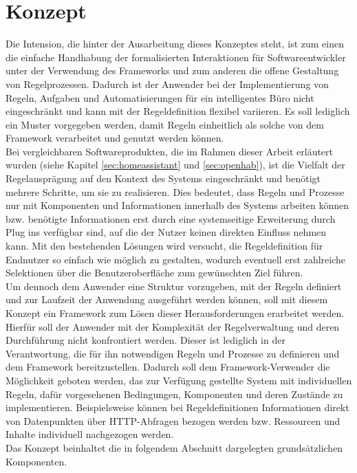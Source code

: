 \section{Konzept}
\label{sec:concept}
    Die Intension, die hinter der Ausarbeitung dieses Konzeptes steht, ist zum einen die einfache Handhabung der 
    formalisierten Interaktionen für Softwareentwickler %
    unter der Verwendung des Frameworks und zum anderen die 
    offene Gestaltung von Regelprozessen. Dadurch ist der Anwender bei der Implementierung von Regeln, Aufgaben und Automatisierungen 
    für ein intelligentes Büro nicht eingeschränkt und kann mit der Regeldefinition flexibel variieren.
    Es soll lediglich ein Muster vorgegeben werden, damit Regeln einheitlich als solche von dem Framework 
    verarbeitet und genutzt werden können. 
    \\ 
    \linebreak
    Bei vergleichbaren Softwareprodukten, die im Rahmen dieser Arbeit erläutert 
    wurden (siehe Kapitel \ref{sec:homeassistant} und \ref{sec:openhab}), ist die Vielfalt der Regelausprägung auf 
    den Kontext des Systems eingeschränkt und benötigt mehrere Schritte, um sie zu realisieren. Dies bedeutet, dass 
    Regeln und Prozesse nur mit Komponenten und Informationen innerhalb des Systems arbeiten können bzw. benötigte 
    Informationen erst durch eine systemseitige Erweiterung durch Plug ins verfügbar sind, auf die der Nutzer keinen direkten 
    Einfluss nehmen kann. Mit den bestehenden Lösungen wird versucht, die Regeldefinition für Endnutzer so 
    einfach wie möglich zu gestalten, wodurch eventuell erst zahlreiche Selektionen über die Benutzeroberfläche zum gewünschten Ziel führen.   
    \\
    \linebreak
    Um dennoch dem Anwender eine Struktur vorzugeben, mit der Regeln definiert und zur Laufzeit der Anwendung ausgeführt 
    werden können, soll mit diesem Konzept ein Framework zum Lösen dieser Herausforderungen erarbeitet werden. Hierfür soll 
    der Anwender mit der Komplexität der Regelverwaltung und deren Durchführung nicht konfrontiert werden. Dieser ist lediglich 
    in der Verantwortung, die für ihn notwendigen Regeln und Prozesse zu definieren und dem Framework bereitzustellen. 
    Dadurch soll dem Framework-Verwender die Möglichkeit geboten werden, das zur Verfügung gestellte System 
    mit individuellen Regeln, dafür vorgesehenen Bedingungen, Komponenten und deren Zustände zu implementieren. Beispielsweise 
    können bei Regeldefinitionen Informationen direkt von Datenpunkten über \acs{HTTP}-Abfragen bezogen werden bzw. Ressourcen 
    und Inhalte individuell nachgezogen werden. 
    \\ 
    Das Konzept beinhaltet die in folgendem Abschnitt dargelegten grundsätzlichen Komponenten. %

